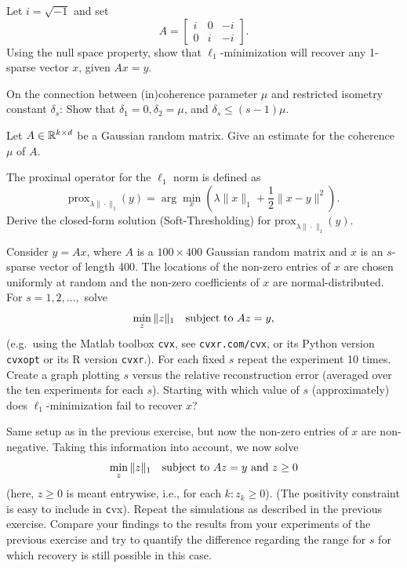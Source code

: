 \begin{myexercise}
Let $i =\sqrt{-1}$ and set
$$
A=
\begin{bmatrix}
i & 0 & -i \\
0 & i & -i
\end{bmatrix}.
$$
Using the null space property, show that $\ell_1$-minimization will recover any
1-sparse vector $x$, given $Ax = y$.
\end{myexercise}

\begin{myexercise}
On the connection between (in)coherence parameter $\mu$  and restricted isometry constant $\delta_{s}$:
Show that $\delta_1 = 0, \delta_2 = \mu$, and $\delta_s \le (s-1)\mu$.
\end{myexercise}

\begin{myexercise}
Let $A \in \mathbb{R}^{k \times d}$ be a Gaussian random matrix. Give an estimate for the coherence $\mu$ of $A$.
\end{myexercise}

\begin{myexercise}
The proximal operator for the $\ell_1$ norm is defined as
$$\text{prox}_{\lambda \|\cdot\|_1}(y) = \arg\min_{x} \left( \lambda \|x\|_1 + \frac{1}{2}\|x-y\|^2 \right).$$
Derive the closed-form solution (Soft-Thresholding) for
$\text{prox}_{\lambda \|\cdot\|_1}(y)$.
\end{myexercise}


\begin{myexercise}
Consider $y=Ax$, where $A$ is a $100 \times 400$ Gaussian random matrix and $x$ is an $s$-sparse
vector of length 400. The locations of the non-zero entries of $x$ are chosen uniformly at random
and the non-zero coefficients of $x$ are normal-distributed. For $s=1,2,\dots,$ solve
$$\underset{z}{\min} \,\|z\|_1 \quad \text{subject to\,\,} Az=y,$$
(e.g.\ using the Matlab toolbox \texttt{cvx}, see \texttt {cvxr.com/cvx}, or its Python version \texttt{cvxopt}  or its R version \texttt{cvxr}.).
For each fixed $s$ repeat the experiment 10 times.
Create a graph plotting $s$ versus the relative reconstruction error (averaged over the ten experiments
for each $s$).
Starting with which value of $s$ (approximately)
does $\ell_1$-minimization fail to recover $x$?
\end{myexercise}

\begin{myexercise}
Same setup as in the previous exercise, but now the non-zero entries of $x$ are non-negative. Taking this information into
account, we now solve
$$\underset{z}{\min}\, \|z\|_1 \quad \text{subject to\,\,} Az=y \,\, \text{and\,\,} z \ge 0$$
(here, $z\ge 0$ is meant entrywise, i.e., for each $k: z_k \ge 0$).
(The positivity constraint is easy to include in {\texttt cvx}).
Repeat the simulations as described in the previous exercise.
Compare your findings to the results from your experiments of the previous exercise and try
to quantify the difference regarding the range for $s$ for which recovery is still possible in this case.    
\end{myexercise}




